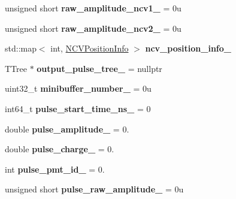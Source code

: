 \begin{DoxyCompactItemize}
\item 
\hypertarget{classPhaseITreeMaker_a02aa5dec1ed25dbbc69d6d555daa39e8}{unsigned short {\bfseries raw\-\_\-amplitude\-\_\-ncv1\-\_\-} = 0u}\label{classPhaseITreeMaker_a02aa5dec1ed25dbbc69d6d555daa39e8}

\item 
\hypertarget{classPhaseITreeMaker_a3753af4c4913247283fafc4f966f53ce}{unsigned short {\bfseries raw\-\_\-amplitude\-\_\-ncv2\-\_\-} = 0u}\label{classPhaseITreeMaker_a3753af4c4913247283fafc4f966f53ce}

\item 
\hypertarget{classPhaseITreeMaker_a874c9efb242b5b92e8f8f90c6fd4f23b}{std\-::map$<$ int, \hyperlink{structNCVPositionInfo}{N\-C\-V\-Position\-Info} $>$ {\bfseries ncv\-\_\-position\-\_\-info\-\_\-}}\label{classPhaseITreeMaker_a874c9efb242b5b92e8f8f90c6fd4f23b}

\item 
\hypertarget{classPhaseITreeMaker_aceed975ee31a653ad428312ffed02f97}{T\-Tree $\ast$ {\bfseries output\-\_\-pulse\-\_\-tree\-\_\-} = nullptr}\label{classPhaseITreeMaker_aceed975ee31a653ad428312ffed02f97}

\item 
\hypertarget{classPhaseITreeMaker_a8cbadc4026164224e74e32de446a8e15}{uint32\-\_\-t {\bfseries minibuffer\-\_\-number\-\_\-} = 0u}\label{classPhaseITreeMaker_a8cbadc4026164224e74e32de446a8e15}

\item 
\hypertarget{classPhaseITreeMaker_a83562863bc7bce788d917cd40d31dfe7}{int64\-\_\-t {\bfseries pulse\-\_\-start\-\_\-time\-\_\-ns\-\_\-} = 0}\label{classPhaseITreeMaker_a83562863bc7bce788d917cd40d31dfe7}

\item 
\hypertarget{classPhaseITreeMaker_aa470eceac054608c14062606d64e6e5f}{double {\bfseries pulse\-\_\-amplitude\-\_\-} = 0.}\label{classPhaseITreeMaker_aa470eceac054608c14062606d64e6e5f}

\item 
\hypertarget{classPhaseITreeMaker_a78af37dbe76387f64abb9a82e12842c3}{double {\bfseries pulse\-\_\-charge\-\_\-} = 0.}\label{classPhaseITreeMaker_a78af37dbe76387f64abb9a82e12842c3}

\item 
\hypertarget{classPhaseITreeMaker_a13e66292551f2732d9091ac454178848}{int {\bfseries pulse\-\_\-pmt\-\_\-id\-\_\-} = 0.}\label{classPhaseITreeMaker_a13e66292551f2732d9091ac454178848}

\item 
\hypertarget{classPhaseITreeMaker_a23f2da00ca69a52485044a39f2bc9ee0}{unsigned short {\bfseries pulse\-\_\-raw\-\_\-amplitude\-\_\-} = 0u}\label{classPhaseITreeMaker_a23f2da00ca69a52485044a39f2bc9ee0}


\end{DoxyCompactItemize}
